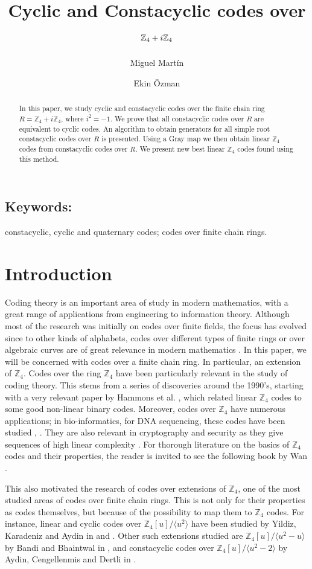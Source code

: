 \documentclass[a4paper, 12pt]{amsart}
\title{Cyclic and Constacyclic codes over $\Z_4+i\Z_4$}
\author{Miguel Martín}
\author{Ekin \"Ozman}
\date{}
\theoremstyle{definition}
\newcommand{\Z}{{\mathbb Z}}
\numberwithin{equation}{section}
\numberwithin{table}{section}
\begin{document}
\maketitle

\begin{abstract}
In this paper, we study cyclic and constacyclic codes over the finite chain ring $R=\Z_4 + i \Z_4$, where $i^2 = -1$. We prove that all constacyclic codes over $R$ are equivalent to cyclic codes. An algorithm to obtain generators for all simple root constacyclic codes over $R$ is presented. Using a Gray map we then obtain linear $\Z_4$ codes from constacyclic codes over $R$. We present new best linear $\Z_4$ codes found using this method.
\end{abstract}

\subsection*{Keywords:} constacyclic, cyclic and quaternary codes; codes over finite chain rings.


\section{Introduction}
Coding theory is an important area of study in modern mathematics, with a great range of applications from engineering to information theory.
Although most of the research was initially on codes over finite fields, the focus has evolved since to other kinds of alphabets, codes over different types of finite rings or over algebraic curves are of great relevance in modern mathematics \cite{book}. In this paper, we will be concerned with codes over a finite chain ring. In particular, an extension of $\Z_4$.
Codes over the ring $\Z_4$ have been particularly relevant in the study of coding theory. This stems from a series of discoveries around the 1990's, starting with a very relevant paper by Hammons et al. \cite{Hammons1994}, which related linear $\Z_4$ codes to some good non-linear binary codes. Moreover, codes over $\Z_4$ have numerous applications; in bio-informatics, for DNA sequencing, these codes have been studied \cite{Milenkovic2006}, \cite{Dimopoulou2020}. They are also relevant in cryptography and security as they give sequences of high linear complexity \cite{Helleseth1999}. For thorough literature on the basics of $\Z_4$ codes and their properties, the reader is invited to see the following book by Wan \cite{wan1997quaternary}.

This also motivated the research of codes over extensions of $\Z_4$, one of the most studied areas of codes over finite chain rings. This is not only for their properties as codes themselves, but because of the possibility to map them to $\Z_4$ codes. For instance, linear and cyclic codes over $\Z_4[u]/\langle u^2 \rangle$ have been studied by Yildiz, Karadeniz and Aydin in \cite{Yildiz2010} and \cite{Yildiz2014}. Other such extensions studied are $\Z_4[u]/\langle u^2-u \rangle$ by Bandi and Bhaintwal in \cite{Bandi2014}, and constacyclic codes over $\Z_4[u]/\langle u^2-2 \rangle$ by Aydin, Cengellenmis and Dertli in \cite{Aydin2024}.
\end{document}

